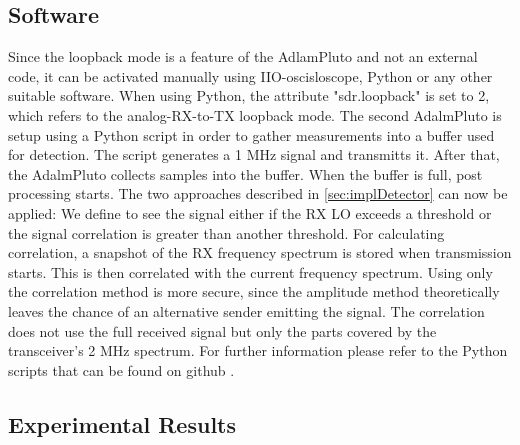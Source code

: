 \documentclass[journal]{IEEEtran}
\begin{document}
\subsection{Software}
\label{subsec:Software}
Since the loopback mode is a feature of the AdlamPluto and not an external code, it can be activated manually using IIO-oscisloscope, Python or any other suitable software.
When using Python, the attribute "sdr.loopback" is set to 2, which refers to the analog-RX-to-TX loopback mode.
The second AdalmPluto is setup using a Python script in order to gather measurements into a buffer used for detection.
The script generates a  1 MHz signal and transmitts it.
After that, the AdalmPluto collects samples into the buffer.
When the buffer is full, post processing starts.
The two approaches described in \ref{sec:implDetector} can now be applied:
We define to see the signal either if the RX LO exceeds a threshold or the signal correlation is greater than another threshold.
For calculating correlation, a snapshot of the RX frequency spectrum is stored when transmission starts.
This is then correlated with the current frequency spectrum.
Using only the correlation method is more secure, since the amplitude method theoretically leaves the chance of an alternative sender emitting the signal.
The correlation does not use the full received signal but only the parts covered by the transceiver's 2 MHz spectrum. 
For further information please refer to the Python scripts that can be found on github \cite{gitscripts}.
 
\subsection{Experimental Results}
\label{subsec:experimental_results}
\end{document}
